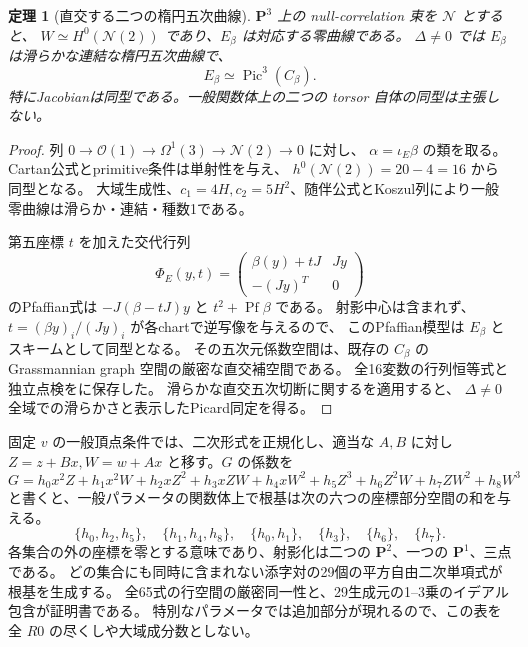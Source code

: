 \documentclass[11pt,a4paper]{ltjsarticle}
\newcommand{\PP}{\mathbf P}
\newtheorem{theorem}{定理}[section]
\theoremstyle{remark}
\begin{document}
\begin{theorem}[直交する二つの楕円五次曲線]
$\PP^3$ 上の null-correlation 束を $\mathcal N$ とすると、
$W\simeq H^0(\mathcal N(2))$ であり、$E_\beta$ は対応する零曲線である。
$\Delta\ne0$ では $E_\beta$ は滑らかな連結な楕円五次曲線で、
\[
 E_\beta\simeq\operatorname{Pic}^3(C_\beta).
\]
特にJacobianは同型である。一般関数体上の二つの torsor 自体の同型は主張しない。
\end{theorem}
\begin{proof}
列 $0\to\mathcal O(1)\to\Omega^1(3)\to\mathcal N(2)\to0$ に対し、
$\alpha=\iota_E\beta$ の類を取る。Cartan公式とprimitive条件は単射性を与え、
$h^0(\mathcal N(2))=20-4=16$ から同型となる。
大域生成性、$c_1=4H,c_2=5H^2$、随伴公式とKoszul列により一般零曲線は滑らか・連結・種数1である。

第五座標 $t$ を加えた交代行列
\[
 \Phi_E(y,t)=\begin{pmatrix}\beta(y)+tJ&Jy\\-(Jy)^T&0\end{pmatrix}
\]
のPfaffian式は $-J(\beta-tJ)y$ と $t^2+\operatorname{Pf}\beta$ である。
射影中心は含まれず、$t=(\beta y)_i/(Jy)_i$ が各chartで逆写像を与えるので、
このPfaffian模型は $E_\beta$ とスキームとして同型となる。
その五次元係数空間は、既存の $C_\beta$ の Grassmannian graph 空間の厳密な直交補空間である。
全16変数の行列恒等式と独立点検を\cite{null-duality-v32}に保存した。
滑らかな直交五次切断に関する\cite[Proposition 2.8]{shinder-zhang-v32}を適用すると、
$\Delta\ne0$ 全域での滑らかさと表示したPicard同定を得る。
\end{proof}

固定 $v$ の一般頂点条件では、二次形式を正規化し、適当な $A,B$ に対し
$Z=z+Bx,W=w+Ax$ と移す。$G$ の係数を
\[
 G=h_0x^2Z+h_1x^2W+h_2xZ^2+h_3xZW+h_4xW^2+
 h_5Z^3+h_6Z^2W+h_7ZW^2+h_8W^3
\]
と書くと、一般パラメータの関数体上で根基は次の六つの座標部分空間の和を与える。
\[
 \{h_0,h_2,h_5\},\quad\{h_1,h_4,h_8\},\quad\{h_0,h_1\},\quad
 \{h_3\},\quad\{h_6\},\quad\{h_7\}.
\]
各集合の外の座標を零とする意味であり、射影化は二つの $\PP^2$、一つの $\PP^1$、三点である。
どの集合にも同時に含まれない添字対の29個の平方自由二次単項式が根基を生成する。
全65式の行空間の厳密同一性と、29生成元の1--3乗のイデアル包含が証明書である\cite{r0-vertex-v32}。
特別なパラメータでは追加部分が現れるので、この表を全 $R0$ の尽くしや大域成分数としない。
\end{document}
